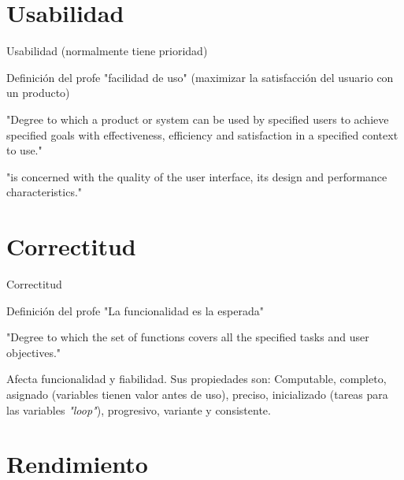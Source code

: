 \section{Usabilidad}

\begin{frame}{Usabilidad (normalmente tiene prioridad)}

    \begin{block}{Definición del profe}
        "facilidad de uso" (maximizar la satisfacción del usuario con un producto)
    \end{block}
    \begin{alertblock}{\cite{ISO25010}}
        "Degree to which a product or system can be used by specified users to achieve specified goals with effectiveness, efficiency and satisfaction in a specified context to use."
    \end{alertblock}
    \begin{exampleblock}{\cite{DromeyR.G1995Amfs}}
        "is concerned with the quality of the user interface, its design and performance characteristics."
    \end{exampleblock}
    
\end{frame}

\section{Correctitud}

\begin{frame}{Correctitud}

    \begin{block}{Definición del profe}
        "La funcionalidad es la esperada"
    \end{block}
    \begin{alertblock}{\cite{ISO25010}}
        "Degree to which the set of functions covers all the specified tasks and user objectives."
    \end{alertblock}
    \begin{exampleblock}{\cite{DromeyR.G1995Amfs}}
        Afecta funcionalidad y fiabilidad. Sus propiedades son: Computable, completo, asignado (variables tienen valor antes de uso), preciso, inicializado (tareas para las variables \textit{"loop"}), progresivo, variante y consistente.
    \end{exampleblock}
\end{frame}


\section{Rendimiento}

